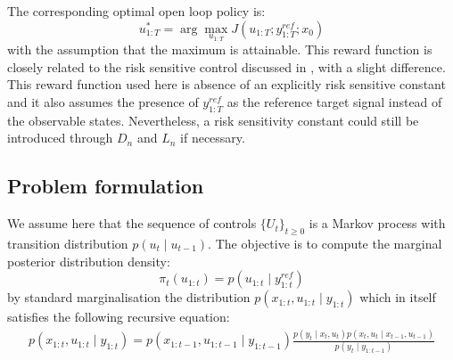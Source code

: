 The corresponding optimal open loop policy is:
\begin{equation}
  u^*_{1:T} = \arg\max_{u_{1:T}} J(u_{1:T};y^{ref}_{1:T};x_0)
\label{eq:optcontrol}
\end{equation}
with the assumption that the maximum is attainable. This reward function is closely related to the risk sensitive control discussed in \cite{WR90}, with a slight difference. This reward function used here is absence of an explicitly risk sensitive constant and it also assumes the presence of $y^{ref}_{1:T}$ as the reference target signal instead of the observable states. Nevertheless, a risk sensitivity constant could still be introduced through $D_n$ and $L_n$ if necessary.

\subsection{Problem formulation}
We assume here that the sequence of controls $\{U_t\}_{t \geq 0}$ is a Markov process with transition distribution $p(u_t \mid u_{t-1})$. The objective is to compute the marginal posterior distribution density:
\begin{equation}
 \pi_t(u_{1:t}) = p(u_{1:t} \mid y^{ref}_{1:t})
\end{equation} 
by standard marginalisation the distribution $p(x_{1:t}, u_{1:t} \mid y_{1:t})$ which in itself satisfies the following recursive equation:
\begin{align}
  p(x_{1:t}, u_{1:t} \mid y_{1:t}) = p(x_{1:t-1}, u_{1:t-1} \mid y_{1:t-1}) \frac{p(y_t \mid x_t, u_t)p(x_t, u_t \mid x_{t-1}, u_{t-1})}{p(y_t \mid y_{1:t-1})}
\end{align}
 
 
 
